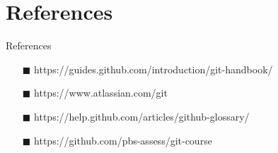 \documentclass[xcolor=dvipsnames,t]{beamer}
\begin{document}
\section{References}
\begin{frame}[allowframebreaks]{References}
	\begin{itemize}
		
		\item[$ \blacksquare $] https://guides.github.com/introduction/git-handbook/
		\item[$ \blacksquare $] https://www.atlassian.com/git 		
		\item[$ \blacksquare $] https://help.github.com/articles/github-glossary/		
		\item[$ \blacksquare $] https://github.com/pbs-assess/git-course
	\end{itemize}
	
	
%	
\end{frame}
\end{document}
